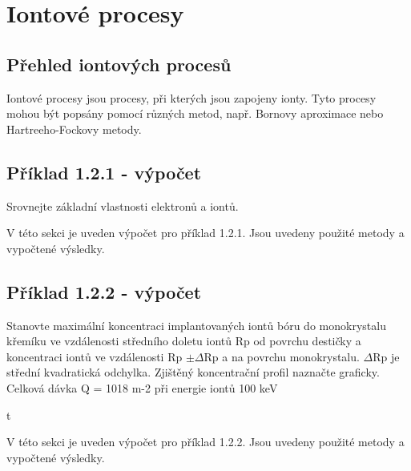 \section{Iontové procesy}

\subsection{Přehled iontových procesů}

Iontové procesy jsou procesy, při kterých jsou zapojeny ionty. Tyto procesy mohou být popsány pomocí různých metod, např. Bornovy aproximace nebo Hartreeho-Fockovy metody.

\subsection{Příklad 1.2.1 - výpočet}
\begin{zadani}
    Srovnejte základní vlastnosti elektronů a iontů.
\end{zadani}


V této sekci je uveden výpočet pro příklad 1.2.1. Jsou uvedeny použité metody a vypočtené výsledky.

\subsection{Příklad 1.2.2 - výpočet}
\begin{zadani}
    Stanovte maximální koncentraci implantovaných iontů bóru do 
    monokrystalu křemíku ve vzdálenosti středního doletu iontů  Rp od 
    povrchu destičky a koncentraci iontů ve vzdálenosti  Rp \(\pm \Delta\)Rp a na 
    povrchu monokrystalu.  \(\Delta\)Rp  je střední kvadratická odchylka. Zjištěný  
    koncentrační profil naznačte graficky. Celková dávka  Q = 1018 m-2 při  
    energie iontů  100 keV
\end{zadani}
t

V této sekci je uveden výpočet pro příklad 1.2.2. Jsou uvedeny použité metody a vypočtené výsledky.